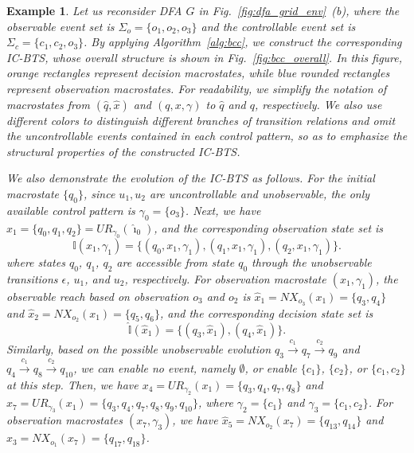 \documentclass[twocolumn]{autart}
\newtheorem{myexm}{Example}
\begin{document}
\begin{myexm}\label{ex:bcc}
    Let us reconsider DFA $G$ in Fig.~\ref{fig:dfa_grid_env}~(b), where the observable event set is
    $\Sigma_o = \{o_1,o_2,o_3\}$ and the controllable event set is
    $\Sigma_c = \{c_1,c_2,o_3\}$.
    By applying Algorithm~\ref{alg:bcc}, we construct the corresponding IC-BTS, whose overall structure is shown in Fig.~\ref{fig:bcc_overall}.
    In this figure, orange rectangles represent decision macrostates, while blue rounded rectangles represent observation macrostates.
    For readability, we simplify the notation of macrostates from $(\hat{q},\hat{x})$ and $(q,x,\gamma)$ to $\hat{q}$ and $q$, respectively.
    We also use different colors to distinguish different branches of transition relations and omit the uncontrollable events contained in each control pattern, so as to emphasize the structural properties of the constructed IC-BTS.

    We also demonstrate the evolution of the IC-BTS as follows.
    For the initial macrostate $\{ q_0 \}$, since $u_1, u_2$ are uncontrollable and unobservable, the only available control pattern is $\gamma_0 = \{ o_3 \}$.
    Next, we have $x_{1} = \{ q_0, q_1, q_2 \} = UR_{\gamma_0}(\hat{\imath}_0)$, and the corresponding observation state set is
    \[
    \mathbb{I}(x_1,\gamma_1) =
    \{(q_0,x_1,\gamma_1),(q_1,x_1,\gamma_1),(q_2,x_1,\gamma_1)\}.
    \]
    where states $q_0$, $q_1$, $q_2$ are accessible from state $q_0$ through the unobservable transitions $\epsilon$, $u_1$, and $u_2$, respectively.
    For observation macrostate $(x_{1}, \gamma_1)$, the observable reach based on observation $o_3$ and $o_2$ is
    $\hat{x}_{1} = NX_{o_3}(x_{1}) = \{ q_3, q_4 \}$ and $\hat{x}_{2} = NX_{o_2}(x_{1}) = \{ q_5, q_6 \}$, and the corresponding decision state set is
    \[
    \hat{\mathbb{I}}(\hat{x}_1)  =
    \{(q_3,\hat{x}_1),(q_4,\hat{x}_1)\}.
    \]
    Similarly, based on the possible unobservable evolution $q_3 \xrightarrow{c_1} q_7 \xrightarrow{c_2} q_9$ and $q_4 \xrightarrow{c_1} q_8 \xrightarrow{c_2} q_{10}$, we can enable no event, namely $\emptyset$, or enable $\{ c_1 \}$, $\{ c_2 \}$, or $\{ c_1,c_2 \}$ at this step.
    Then, we have
    $x_{4} = UR_{\gamma_2}(x_{1}) = \{ q_3, q_4, q_7, q_8 \}$ and
    $x_{7} = UR_{\gamma_3}(x_{1}) = \{ q_3, q_4, q_7, q_8, q_9, q_{10} \}$,
    where $\gamma_2 = \{ c_1 \}$ and $\gamma_3 = \{ c_1, c_2 \}$.
    For observation macrostates $(x_{7}, \gamma_3)$, we have
    $\hat{x}_{5} = NX_{o_2}(x_{7}) = \{ q_{13}, q_{14} \}$ and
    $\hat{x}_{3} = NX_{o_1}(x_{7}) = \{ q_{17}, q_{18} \}$.
\end{myexm}
\end{document}
